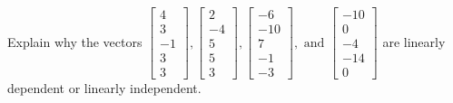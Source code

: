\documentclass{article}
\begin{document}
\begin{exerciseStatement}
    Explain why the vectors \(\left[\begin{array}{r}
4 \\
3 \\
-1 \\
3 \\
3
\end{array}\right] , \left[\begin{array}{r}
2 \\
-4 \\
5 \\
5 \\
3
\end{array}\right] , \left[\begin{array}{r}
-6 \\
-10 \\
7 \\
-1 \\
-3
\end{array}\right] , \text{ and } \left[\begin{array}{r}
-10 \\
0 \\
-4 \\
-14 \\
0
\end{array}\right]\) are linearly dependent or linearly independent.


  
\end{exerciseStatement}
\end{document}
